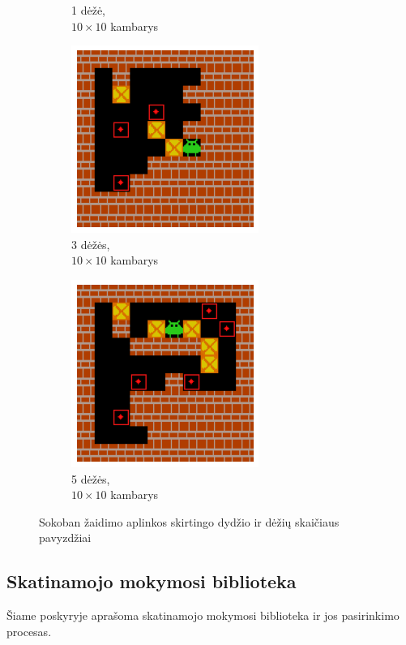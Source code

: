 \documentclass{VUMIFPSbakalaurinis}
\begin{document}
{\begin{figure}[H]
\begin{subfigure}[b]{.2\textwidth}
			\captionsetup{justification=centering}
			\caption{1 dėžė,\\ \(10 \times 10\) kambarys}
			\label{img:room_3}
		\end{subfigure}%
		\begin{subfigure}[b]{.2\textwidth}
			\centering
			\includegraphics[scale=0.4]{img/sokoban/rooms/1}
			\captionsetup{justification=centering}
			\caption{3 dėžės,\\ \(10 \times 10\) kambarys}
			\label{img:room_4}
		\end{subfigure}%
		\begin{subfigure}[b]{.2\textwidth}
			\centering
			\includegraphics[scale=0.4]{img/sokoban/rooms/2}
			\captionsetup{justification=centering}
			\caption{5 dėžės,\\ \(10 \times 10\) kambarys}
			\label{img:room_5}
		\end{subfigure}%
		\caption{Sokoban žaidimo aplinkos skirtingo dydžio ir dėžių skaičiaus pavyzdžiai}
		\label{img:sokoban_examples}
	\end{figure} 
}
\subsection{Skatinamojo mokymosi biblioteka}
Šiame poskyryje aprašoma skatinamojo mokymosi biblioteka ir jos pasirinkimo procesas.
\end{document}

